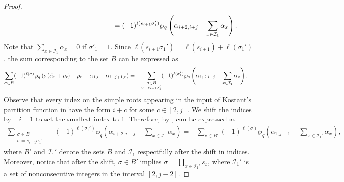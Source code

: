 \documentclass[10pt]{article}
\newcommand{\hr}[0]{\Tilde{\alpha}}
\newcommand{\qpartition}[1]{\wp_q\left(#1\right)}
\begin{document}
\begin{proof}
\begin{align}
        &\hspace{5cm}= (-1)^{\ell(s_{i+1}\sigma_1')}\qpartition{\alpha_{i+2,i+j}-\sum_{x\in\mathcal{I}_1}\alpha_x}.\notag
    \end{align}
    Note that $\sum_{x\in\mathcal{I}_1}\alpha_x=0$ if $\sigma'_1=1$. Since $\ell(s_{i+1}\sigma_1')=\ell(s_{i+1})+\ell(\sigma_1')$, the sum corresponding to the set $B$ can be expressed as
    \begin{align}
        \sum_{\sigma\in B}(-1)^{\ell(\sigma)}\qpartition{\sigma(\hr_r+\rho_r)-\rho_r-\alpha_{1,i}-\alpha_{i+j+1,r}} &= -\sum_{\substack{\sigma\in B \\ \sigma=s_{i+1}\sigma_1'}}(-1)^{\ell(\sigma_1')}\qpartition{\alpha_{i+2,i+j}-\sum_{x\in\mathcal{I}_1}\alpha_x}.\label{eq: case 2 in diff of q's}
    \end{align}
    Observe that every index on the simple roots appearing in the input of Kostant's partition function in  have the form $i+c$ for some $c\in[2,j]$.
    We shift the indices by $-i-1$ to set the smallest index to 1. 
    Therefore, by ,  can be expressed as 
    \begin{align}
        \sum_{\substack{\sigma\in B \\ \sigma=s_{i+1}\sigma_1'}} -(-1)^{\ell(\sigma_1')}\qpartition{\alpha_{i+2,i+j}-\sum_{x\in\mathcal{I}_1}\alpha_x}=-\sum_{\sigma\in B'} (-1)^{\ell(\sigma)}\qpartition{\alpha_{1,j-1}-\sum_{x\in\mathcal{I}_1'}\alpha_x},\label{XXXX} 
    \end{align}
    where $B'$ and $\mathcal{I}_1'$ denote the sets $B$ and $\mathcal{I}_1$ respectfully after the shift in indices. Moreover, notice that after the shift, $\sigma\in B'$ implies $\sigma=\prod_{x\in\mathcal{I}_1'}s_x$, where $\mathcal{I}_1'$ is a set of nonconsecutive integers in the interval $[2,j-2]$.
    

\end{proof}
\end{document}
